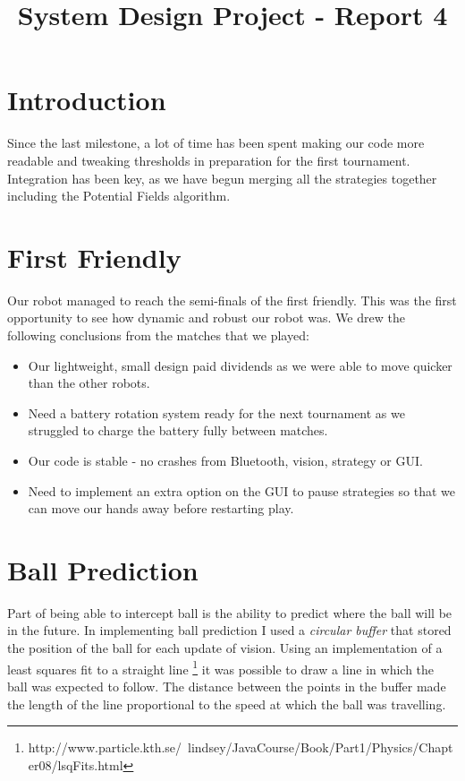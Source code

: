 \documentclass[conference,12pt]{IEEEtran}
\begin{document}
	
\title{\vspace{-0.05\textheight}System Design Project - Report 4}

\author{\vspace{-0.05\textheight}
}
	
\maketitle

\IEEEpeerreviewmaketitle

\section{Introduction}
Since the last milestone, a lot of time has been spent making our code more readable and tweaking thresholds in preparation for the first tournament. Integration has been key, as we have begun merging all the strategies together including the Potential Fields algorithm.
	
\section{First Friendly}
Our robot managed to reach the semi-finals of the first friendly. This was the first opportunity to see how dynamic and robust our robot was. We drew the following conclusions from the matches that we played:
\begin{itemize}
\item Our lightweight, small design paid dividends as we were able to move quicker than the other robots.
\item Need a battery rotation system ready for the next tournament as we struggled to charge the battery fully between matches.
\item Our code is stable - no crashes from Bluetooth, vision, strategy or GUI.
\item Need to implement an extra option on the GUI to pause strategies so that we can move our hands away before restarting play.
\end{itemize}

\section{Ball Prediction}
Part of being able to intercept ball is the ability to predict where the ball will be in the future. In implementing ball prediction I used a \textit{circular buffer} that stored the position of the ball for each update of vision. Using an implementation of a least squares fit to a straight line \footnote{http://www.particle.kth.se/~lindsey/JavaCourse/Book/Part1/Physics/Chapter08/lsqFits.html} it was possible to draw a line in which the ball was expected to follow. The distance between the points in the buffer made the length of the line proportional to the speed at which the ball was travelling.
\end{document}

